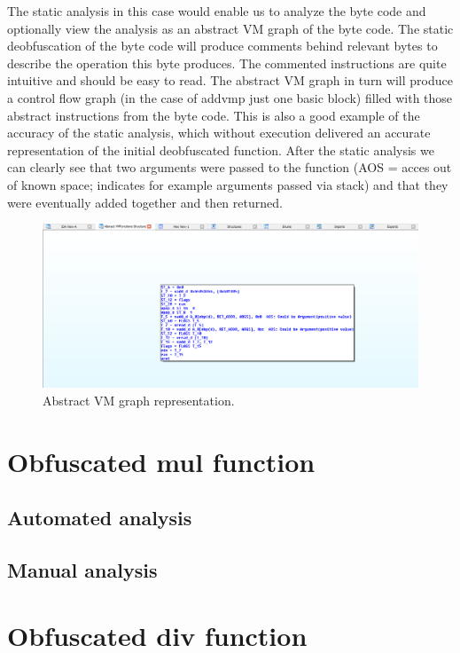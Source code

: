 \documentclass[10pt,twoside,a4paper,bibliography=totoc]{scrbook}
\begin{document}
The  static analysis  in this case would enable us to analyze the byte code and optionally view the analysis as an  abstract VM graph  of the byte code. The static deobfuscation of the byte code will produce comments behind relevant bytes to describe the operation this byte produces. The commented instructions are quite intuitive and should be easy to read.
The abstract VM graph in turn will produce a control flow graph (in the case of addvmp just one basic block) filled with those abstract instructions from the byte code. This is also a good example of the accuracy of the static analysis, which without execution delivered an accurate representation of the initial deobfuscated function. After the static analysis we can clearly see that two arguments were passed to the function  (AOS = acces out of known space; indicates for example arguments passed via stack)  and that they were eventually added together and then returned.

\begin{figure}[htp]
\centering
\includegraphics[scale=0.45]{images/ch3/ab_vm_graph.png}
\caption{Abstract VM graph representation.}
\label{abs_vm_graph}
\end{figure}

\section{Obfuscated mul function}
\subsection{Automated analysis}
\subsection{Manual analysis}
\section{Obfuscated div function}
\end{document}
